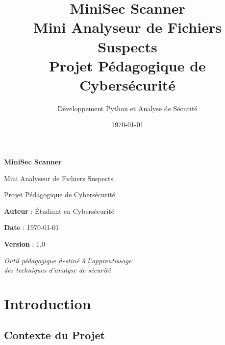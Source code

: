 \documentclass[12pt,a4paper]{report}
\title{\textbf{MiniSec Scanner} \\
\large Mini Analyseur de Fichiers Suspects \\
\large Projet Pédagogique de Cybersécurité}
\author{Développement Python et Analyse de Sécurité}
\date{\today}
\begin{document}
\begin{titlepage}
    \centering
    \vspace*{2cm}
    
    {\huge\bfseries MiniSec Scanner\par}
    \vspace{1cm}
    
    {\large Mini Analyseur de Fichiers Suspects\par}
    \vspace{0.5cm}
    
    {\large Projet Pédagogique de Cybersécurité\par}
    \vspace{2cm}
    
    
    \vfill
    
    {\large\textbf{Auteur}} : Étudiant en Cybersécurité\par
    {\large\textbf{Date}} : \today\par
    {\large\textbf{Version}} : 1.0\par
    
    \vspace{1cm}
    
    \textit{Outil pédagogique destiné à l'apprentissage\\
    des techniques d'analyse de sécurité}
\end{titlepage}

\tableofcontents
\newpage

\chapter{Introduction}

\section{Contexte du Projet}
\end{document}
